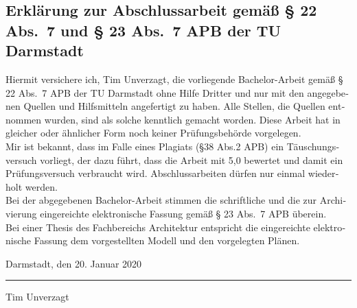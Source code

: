 \documentclass[longdoc,accentcolor=tud1b,11pt,paper=a4]{tudreport}
\title{\komTitle}
\subtitle{\komTitleTranslation \\ \komThesisType}
\newcommand{\komThesisType}{Bachelor-Arbeit\xspace}
\newcommand{\komName}{Tim Unverzagt\xspace}
\newcommand{\komSubmissionDate}{20. Januar 2020\xspace}%
\begin{document}
	
	\frenchspacing
	\raggedbottom
	\maketitle
	

    \begin{otherlanguage}{ngerman}
    \chapter*{Erklärung zur Abschlussarbeit gemäß § 22 Abs.\ 7 und § 23 Abs.\ 7 APB der TU Darmstadt}
    Hiermit versichere ich, \komName, die vorliegende \komThesisType gemäß § 22 Abs.\ 7 APB der TU Darmstadt ohne Hilfe Dritter und nur mit den angegebenen Quellen und Hilfsmitteln angefertigt zu haben. 
    Alle Stellen, die Quellen entnommen wurden, sind als solche kenntlich gemacht worden. 
    Diese Arbeit hat in gleicher oder ähnlicher Form noch keiner Prüfungsbehörde vorgelegen.\\

    \noindent Mir ist bekannt, dass im Falle eines Plagiats (§38 Abs.2 APB) ein Täuschungsversuch vorliegt, der dazu führt, dass die Arbeit mit 5,0 bewertet und damit ein Prüfungsversuch verbraucht wird. 
    Abschlussarbeiten dürfen nur einmal wiederholt werden.\\

    \noindent Bei der abgegebenen \komThesisType stimmen die schriftliche und die zur Archivierung eingereichte elektronische Fassung gemäß § 23 Abs.\ 7 APB überein. \\
    
    \noindent Bei einer Thesis des Fachbereichs Architektur entspricht die eingereichte elektronische Fassung dem vorgestellten Modell und den vorgelegten Plänen.
    
    \vspace{4em}
    
    \noindent Darmstadt, den \komSubmissionDate 
    
    \vspace{3em}
    
    \noindent\rule{5cm}{0.4pt}
    
    \noindent\komName
    
    \end{otherlanguage}
	
\end{document}
